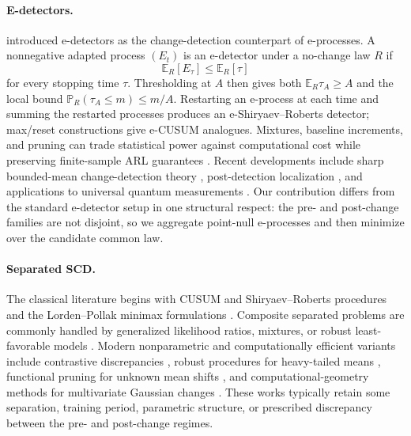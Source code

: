 \documentclass[12pt]{article}
\theoremstyle{spaced}
\theoremstyle{remark}
\newcommand{\E}{\mathbb E}
\newcommand{\bbP}{\mathbb P}
\begin{document}
\paragraph{E-detectors.}
\citet{shin2022detectors} introduced e-detectors as the change-detection
counterpart of e-processes.  A nonnegative adapted process $(E_t)$ is an
e-detector under a no-change law $R$ if
\[
  \E_R[E_\tau]\le \E_R[\tau]
\]
for every stopping time $\tau$.  Thresholding at $A$ then gives both
$\E_R\tau_A\ge A$ and the local bound
$\bbP_R(\tau_A\le m)\le m/A$.  Restarting an e-process at each time and
summing the restarted processes produces an e-Shiryaev--Roberts detector;
max/reset constructions give e-CUSUM analogues.  Mixtures, baseline
increments, and pruning can trade statistical power against computational
cost while preserving finite-sample ARL guarantees
\citep{shin2022detectors}.  Recent developments include sharp bounded-mean
change-detection theory \citep{ram2026boundedmeans}, post-detection
localization \citep{saha2025post}, and applications to universal quantum
measurements \citep{zecchin2026quantum}.  Our contribution differs from the
standard e-detector setup in one structural respect: the pre- and post-change
families are not disjoint, so we aggregate point-null e-processes and then
minimize over the candidate common law.

\paragraph{Separated SCD.}
The classical literature begins with CUSUM and Shiryaev--Roberts procedures
\citep{page1954continuous,shiryaev1963optimum,roberts1966comparison} and the
Lorden--Pollak minimax formulations \citep{lorden1971procedures,pollak1985optimal}.
Composite separated problems are commonly handled by generalized likelihood
ratios, mixtures, or robust least-favorable models
\citep{siegmund1995using,lai1998information,tartakovsky2014sequential}.
Modern nonparametric and computationally efficient variants include
contrastive discrepancies \citep{puchkin2023contrastive}, robust procedures
for heavy-tailed means \citep{sankararaman2023heavy}, functional pruning for
unknown mean shifts \citep{romano2023focus}, and computational-geometry
methods for multivariate Gaussian changes \citep{pishchagina2026geometry}.
These works typically retain some separation, training period, parametric
structure, or prescribed discrepancy between the pre- and post-change
regimes.
\end{document}
